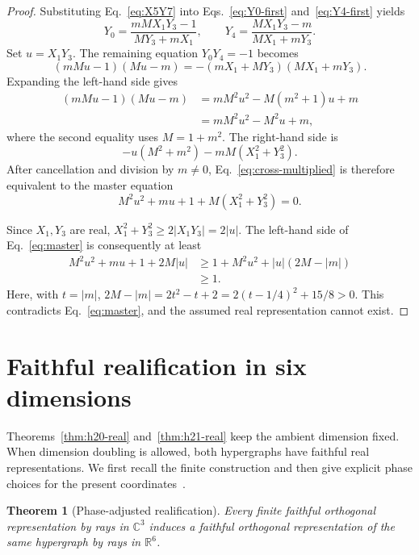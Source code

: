 \documentclass[twocolumn,aps,pra,floatfix,amsmath,amssymb,longbibliography]{revtex4-2}
\newtheorem{theorem}{Theorem}
\theoremstyle{definition}
\theoremstyle{remark}
\newcommand{\C}{\mathbb C}
\newcommand{\R}{\mathbb R}
\begin{document}
\begin{proof}
Substituting Eq.~\eqref{eq:X5Y7} into
Eqs.~\eqref{eq:Y0-first} and~\eqref{eq:Y4-first} yields
\begin{equation}
 Y_0=\frac{mMX_1Y_3-1}{MY_3+mX_1},\qquad
 Y_4=\frac{MX_1Y_3-m}{MX_1+mY_3}.
 \label{eq:Y0Y4-final}
\end{equation}
Set $u=X_1Y_3$.  The remaining equation $Y_0Y_4=-1$ becomes
\begin{equation}
 (mMu-1)(Mu-m)=-(mX_1+MY_3)(MX_1+mY_3).
 \label{eq:cross-multiplied}
\end{equation}
Expanding the left-hand side gives
\begin{align*}
 (mMu-1)(Mu-m)
 &=mM^2u^2-M(m^2+1)u+m\\
 &=mM^2u^2-M^2u+m,
\end{align*}
where the second equality uses $M=1+m^2$.
The right-hand side is
\[
 -u(M^2+m^2)-mM(X_1^2+Y_3^2).
\]
After cancellation and division by $m\ne0$, Eq.~\eqref{eq:cross-multiplied}
is therefore equivalent to the master equation
\begin{equation}
 M^2u^2+mu+1+M(X_1^2+Y_3^2)=0.
 \label{eq:master}
\end{equation}

Since $X_1,Y_3$ are real,
$X_1^2+Y_3^2\ge2|X_1Y_3|=2|u|$.  The left-hand side of
Eq.~\eqref{eq:master} is consequently at least
\begin{align*}
 M^2u^2+mu+1+2M|u|
 &\ge 1+M^2u^2+|u|(2M-|m|)\\
 &\ge1.
\end{align*}
Here, with $t=|m|$,
$2M-|m|=2t^2-t+2=2(t-1/4)^2+15/8>0$.
This contradicts
Eq.~\eqref{eq:master}, and the assumed real representation cannot exist.
\end{proof}

\section{Faithful realification in six dimensions}
\label{sec:realification}

Theorems~\ref{thm:h20-real} and~\ref{thm:h21-real} keep the ambient
dimension fixed.  When dimension doubling is allowed, both hypergraphs have
faithful real representations.  We first recall the finite construction and
then give explicit phase choices for the present
coordinates~\cite{svozil-2025-rvc}.

\begin{theorem}[Phase-adjusted realification]
\label{thm:realification}
Every finite faithful orthogonal representation by rays in $\C^3$ induces a
faithful orthogonal representation of the same hypergraph by rays in $\R^6$.
\end{theorem}
\end{document}
